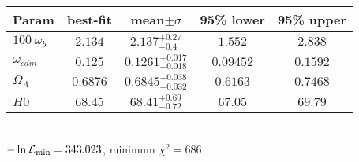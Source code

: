 \begin{tabular}{|l|c|c|c|c|} 
 \hline 
Param & best-fit & mean$\pm\sigma$ & 95\% lower & 95\% upper \\ \hline 
$100~\omega_{b }$ &$2.134$ & $2.137_{-0.4}^{+0.27}$ & $1.552$ & $2.838$ \\ 
$\omega_{cdm }$ &$0.125$ & $0.1261_{-0.018}^{+0.017}$ & $0.09452$ & $0.1592$ \\ 
$\Omega_{\Lambda }$ &$0.6876$ & $0.6845_{-0.032}^{+0.038}$ & $0.6163$ & $0.7468$ \\ 
$H0$ &$68.45$ & $68.41_{-0.72}^{+0.69}$ & $67.05$ & $69.79$ \\ 
\hline 
 \end{tabular} \\ 
$-\ln{\cal L}_\mathrm{min} =343.023$, minimum $\chi^2=686$ \\ 
